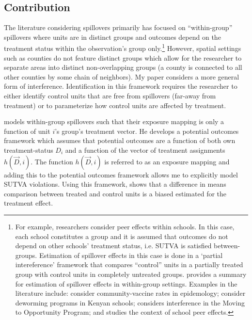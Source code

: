 \documentclass[11pt]{article}
\begin{document}

\subsection{Contribution}

The literature considering spillovers primarily has focused on ``within-group'' spillovers where units are in distinct groups and outcomes depend on the treatment status within the observation's group only.\footnote{For example, researchers consider peer effects within schools. In this case, each school constitutes a group and it is assumed that outcomes do not depend on other schools' treatment status, i.e. SUTVA is satisfied between-groups. Estimation of spillover effects in this case is done in a `partial intereference' framework that compares ``control'' units in a partially treated group with control units in completely untreated groups. \citet{Angelucci_DiMaro_2016} provides a summary for estimation of spillover effects in within-group settings. Examples in the literature include: \citet{Halloran_Struchiner_1995} consider community-vaccine rates in epidemology; \citet{Miguel_Kremer_2004} consider deworming programs in Kenyan schools; \citet{Sobel_2006} considers interference in the Moving to Opportunity Program; and \citet{Angrist_2014} studies the context of school peer effects.} However, spatial settings such as counties do not feature distinct groups which allow for the researcher to separate areas into distinct non-overlapping groups (a county is connected to all other counties by some chain of neighbors). My paper considers a more general form of interference. Identification in this framework requires the researcher to either identify control units that are free from spillovers (far-away from treatment) or to parameterize how control units are affected by treatment.

\citet{Vazquez-Bare_2019} models within-group spillovers such that their exposure mapping is only a function of unit $i$'s group's treatment vector. He develops a potential outcomes framework which assumes that potential outcomes are a function of both own treatment-status $D_i$ and a function of the vector of treatment assignments $h(\vec{D}, i)$. The function $h(\vec{D}, i)$ is referred to as an exposure mapping and adding this to the potential outcomes framework allows me to explicitly model SUTVA violations. Using this framework, \citet{Vazquez-Bare_2019} shows that a difference in means comparison between treated and control units is a biased estimated for the treatment effect. 
\end{document}
